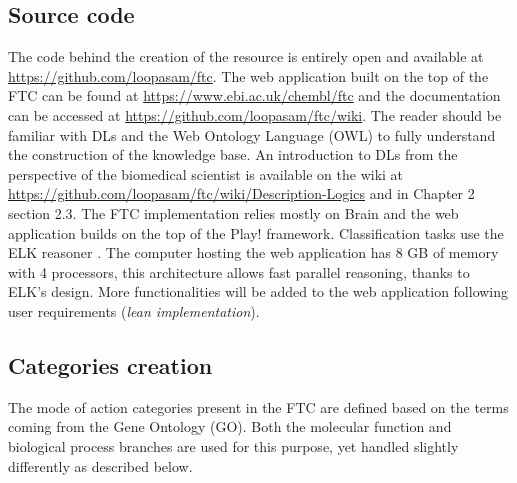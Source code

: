 \subsection{Source code}
The code behind the creation of the resource is entirely open and available at \url{https://github.com/loopasam/ftc}. The web application built on the top of the FTC can be found at \url{https://www.ebi.ac.uk/chembl/ftc} and the documentation can be accessed at \url{https://github.com/loopasam/ftc/wiki}. The reader should be familiar with DLs and the Web Ontology Language (OWL) to fully understand the construction of the knowledge base. An introduction to DLs from the perspective of the biomedical scientist is available on the wiki at \url{https://github.com/loopasam/ftc/wiki/Description-Logics} and in Chapter 2 section 2.3. The FTC implementation relies mostly on Brain \citep{croset2013brain} and the web application builds on the top of the Play! framework. Classification tasks use the ELK reasoner \citep{kazakov2013incredible}. The computer hosting the web application has 8 GB of memory with 4 processors, this architecture allows fast parallel reasoning, thanks to ELK's design. More functionalities will be added to the web application following user requirements (\emph{lean implementation}).

\subsection{Categories creation}
\label{catfunc}

The mode of action categories present in the FTC are defined based on the terms coming from the Gene Ontology (GO). Both the molecular function and biological process branches are used for this purpose, yet handled slightly differently as described below.

